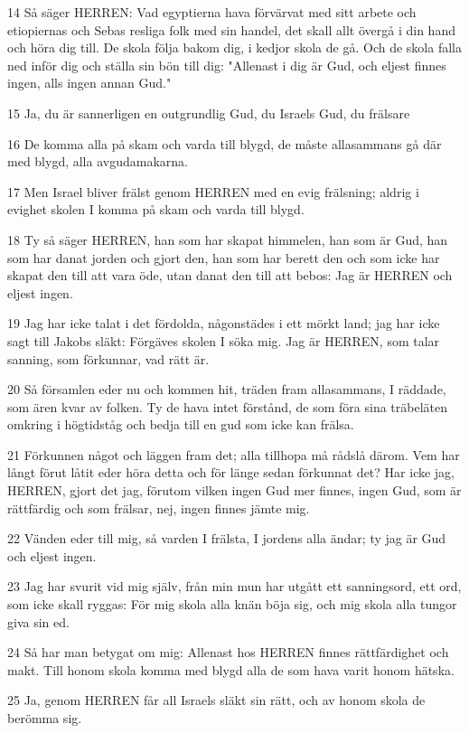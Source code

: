 \par 14 Så säger HERREN: Vad egyptierna hava förvärvat med sitt arbete och etiopiernas och Sebas resliga folk med sin handel, det skall allt övergå i din hand och höra dig till. De skola följa bakom dig, i kedjor skola de gå. Och de skola falla ned inför dig och ställa sin bön till dig: "Allenast i dig är Gud, och eljest finnes ingen, alls ingen annan Gud."
\par 15 Ja, du är sannerligen en outgrundlig Gud, du Israels Gud, du frälsare
\par 16 De komma alla på skam och varda till blygd, de måste allasammans gå där med blygd, alla avgudamakarna.
\par 17 Men Israel bliver frälst genom HERREN med en evig frälsning; aldrig i evighet skolen I komma på skam och varda till blygd.
\par 18 Ty så säger HERREN, han som har skapat himmelen, han som är Gud, han som har danat jorden och gjort den, han som har berett den och som icke har skapat den till att vara öde, utan danat den till att bebos: Jag är HERREN och eljest ingen.
\par 19 Jag har icke talat i det fördolda, någonstädes i ett mörkt land; jag har icke sagt till Jakobs släkt: Förgäves skolen I söka mig. Jag är HERREN, som talar sanning, som förkunnar, vad rätt är.
\par 20 Så församlen eder nu och kommen hit, träden fram allasammans, I räddade, som ären kvar av folken. Ty de hava intet förstånd, de som föra sina träbeläten omkring i högtidståg och bedja till en gud som icke kan frälsa.
\par 21 Förkunnen något och läggen fram det; alla tillhopa må rådslå därom. Vem har långt förut låtit eder höra detta och för länge sedan förkunnat det? Har icke jag, HERREN, gjort det jag, förutom vilken ingen Gud mer finnes, ingen Gud, som är rättfärdig och som frälsar, nej, ingen finnes jämte mig.
\par 22 Vänden eder till mig, så varden I frälsta, I jordens alla ändar; ty jag är Gud och eljest ingen.
\par 23 Jag har svurit vid mig själv, från min mun har utgått ett sanningsord, ett ord, som icke skall ryggas: För mig skola alla knän böja sig, och mig skola alla tungor giva sin ed.
\par 24 Så har man betygat om mig: Allenast hos HERREN finnes rättfärdighet och makt. Till honom skola komma med blygd alla de som hava varit honom hätska.
\par 25 Ja, genom HERREN får all Israels släkt sin rätt, och av honom skola de berömma sig.

